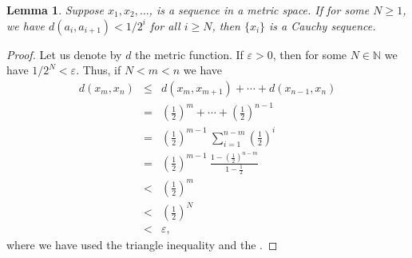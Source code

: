 \documentclass[12pt]{article}
\newcommand{\sN}[0]{\mathbb{N}}
\newtheorem{lemma}{Lemma}
\begin{document}
\begin{lemma}
Suppose $x_1, x_2, \ldots$, is a sequence in a metric space. 
If for some $N\ge 1$, we have $d(a_i,a_{i+1})<1/2^i$ for all $i\ge N$, 
then $\{x_i\}$ is a Cauchy sequence. 
\end{lemma}

\begin{proof} 
Let us denote by $d$ the metric function. 
If $\varepsilon>0$, then for some $N\in \sN$ we have $1/2^N<\varepsilon$.
Thus, if $N<m<n$ we have
\begin{eqnarray*}
d(x_m, x_n) &\le& d(x_m, x_{m+1}) + \cdots + d(x_{n-1}, x_n) \\
   &=& \left(\frac{1}{2}\right)^m + \cdots + \left(\frac{1}{2}\right)^{n-1} \\
   &=&  \left(\frac{1}{2}\right)^{m-1} \ \sum_{i=1}^{n-m} \left(\frac{1}{2}\right)^i \\
   &=&  \left(\frac{1}{2}\right)^{m-1} \ \frac{1-\left(\frac{1}{2}\right)^{n-m}}{1-\frac{1}{2}} \\
   &<&  \left(\frac{1}{2}\right)^{m} \\
   &<&  \left(\frac{1}{2}\right)^{N} \\
   &<&  \varepsilon,
\end{eqnarray*}
where we have used the triangle inequality and the 
.
\end{proof}
\end{document}
